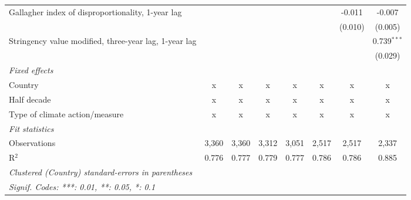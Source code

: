 \begin{table}[htbp]
\begin{tabular}{lccccccc}
      Gallagher index of disproportionality, 1-year lag     &         &         &             &             &               & -0.011        & -0.007\\   
                                                            &         &         &             &             &               & (0.010)       & (0.005)\\   
      Stringency value modified, three-year lag, 1-year lag &         &         &             &             &               &               & 0.739$^{***}$\\   
                                                            &         &         &             &             &               &               & (0.029)\\   
      \emph{Fixed effects}\\
      Country                                               & x       & x       & x           & x           & x             & x             & x\\  
      Half decade                                           & x       & x       & x           & x           & x             & x             & x\\  
      Type of climate action/measure                        & x       & x       & x           & x           & x             & x             & x\\  
      \midrule \emph{Fit statistics}\\
      Observations                                          & 3,360   & 3,360   & 3,312       & 3,051       & 2,517         & 2,517         & 2,337\\  
      R$^2$                                                 & 0.776   & 0.777   & 0.779       & 0.777       & 0.786         & 0.786         & 0.885\\  
      \midrule
      \multicolumn{8}{l}{\emph{Clustered (Country) standard-errors in parentheses}}\\
      \multicolumn{8}{l}{\emph{Signif. Codes: ***: 0.01, **: 0.05, *: 0.1}}\\
   \end{tabular}
\end{table}


